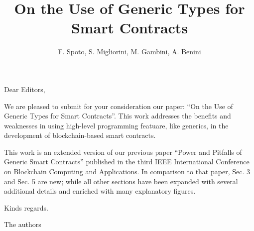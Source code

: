 \documentclass[journal,onecolumn, 11pt]{IEEEtran}
\begin{document}
\title{{\LARGE On the Use of Generic Types for Smart Contracts}}

\author{{\normalsize F. Spoto, S. Migliorini, M. Gambini, A. Benini}}

\date{}

\maketitle

Dear Editors,

We are pleased to submit for your consideration our paper: ``On the Use of Generic Types for Smart Contracts''. This work addresses the benefits and weaknesses in using high-level programming featuare, like generics, in the development of blockchain-based smart contracts. 


This work is an extended version of our previous paper ``Power and Pitfalls of Generic Smart Contracts'' published in the third IEEE International Conference on Blockchain Computing and Applications. In comparison to that paper, Sec. 3 and Sec. 5 are new; while all other sections have been expanded with several additional details and enriched with many explanatory figures.

\hspace{7cm}

Kinds regards.

The authors
\end{document}
